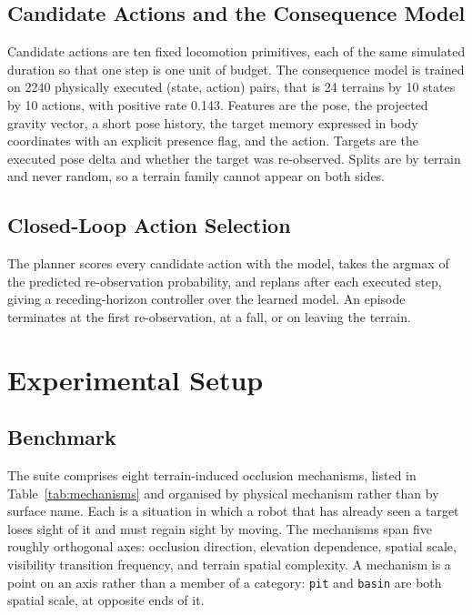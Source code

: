 \documentclass[conference]{IEEEtran}
\begin{document}
\subsection{Candidate Actions and the Consequence Model}

Candidate actions are ten fixed locomotion primitives, each of the same simulated
duration so that one step is one unit of budget. The consequence model is trained on
2240 physically executed (state, action) pairs, that is 24 terrains by 10 states by 10
actions, with positive rate 0.143. Features are the pose, the projected gravity
vector, a short pose history, the target memory expressed in body coordinates with an
explicit presence flag, and the action. Targets are the executed pose delta and
whether the target was re-observed. Splits are by terrain and never random, so a
terrain family cannot appear on both sides.

\subsection{Closed-Loop Action Selection}

The planner scores every candidate action with the model, takes the argmax of the
predicted re-observation probability, and replans after each executed step, giving a
receding-horizon controller over the learned model. An episode terminates at the first
re-observation, at a fall, or on leaving the terrain.

\section{Experimental Setup}

\subsection{Benchmark}

The suite comprises eight terrain-induced occlusion mechanisms, listed in
Table~\ref{tab:mechanisms} and organised by physical mechanism rather than by surface
name. Each is a situation in which a robot that has already seen a target loses sight
of it and must regain sight by moving. The mechanisms span five roughly orthogonal
axes: occlusion direction, elevation dependence, spatial scale, visibility transition
frequency, and terrain spatial complexity. A mechanism is a point on an axis rather
than a member of a category: \texttt{pit} and \texttt{basin} are both spatial scale,
at opposite ends of it.
\end{document}
